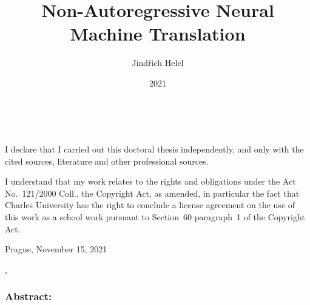 \documentclass[12pt,notitlepage,a4paper,openright]{report}
\title{Non-Autoregressive Neural Machine Translation}
\author{Jindřich Helcl}
\date{2021}
\begin{document}
%
%
%
\renewcommand{\thepage}{\roman{page}}
\maketitle

\pagestyle{plain}
\normalsize %
\setcounter{page}{2} %

\cleardoublepage{}
\ \vspace{10mm}

\noindent \it

\vspace{\fill}
\noindent \rm
I declare that I carried out this doctoral thesis independently,
  and only with the cited sources, literature and other professional sources.

I understand that my work relates to the rights and obligations
  under the Act No.~121/2000 Coll., the Copyright Act, as amended,
  in particular the fact that Charles University has the right
  to conclude a license agreement on the use of this work as a school work
  pursuant to Section~60 paragraph~1 of the Copyright Act.

\vspace{2cm}
\noindent Prague, November 15, 2021 \hspace{\fill}\theauthor\\ %


\cleardoublepage{} %
\pagestyle{plain}
{}
\begin{description}[leftmargin=7.5em,labelwidth=7em,labelindent=0em,labelsep=0.5em]
\item[Title:] \thetitle{}
\item[Author:] \theauthor{}
\item[Department:] \thedept{}
\item[Supervisor:] \thesupervisor{},\\ \thedept{}
\end{description}
\subsubsection{Abstract:}
\end{document}
